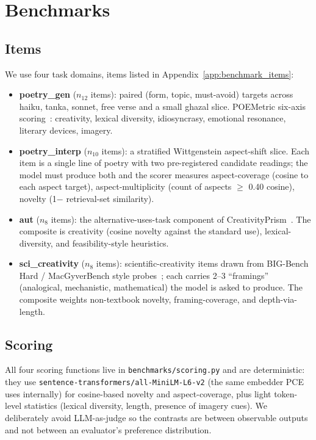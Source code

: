 \section{Benchmarks}\label{sec:benchmarks}

\subsection{Items}

We use four task domains, items listed in Appendix~\ref{app:benchmark_items}:

\begin{itemize}[leftmargin=1.4em]
\item \textbf{poetry\_gen} ($n_{\text{12}}$ items): paired (form, topic, must-avoid) targets across haiku, tanka, sonnet, free verse and a small ghazal slice. POEMetric six-axis scoring~\citep{Ye2025POEMetric}: creativity, lexical diversity, idiosyncrasy, emotional resonance, literary devices, imagery.
\item \textbf{poetry\_interp} ($n_{\text{10}}$ items): a stratified Wittgenstein aspect-shift slice. Each item is a single line of poetry with two pre-registered candidate readings; the model must produce both and the scorer measures aspect-coverage (cosine to each aspect target), aspect-multiplicity (count of aspects $\geq$ 0.40 cosine), novelty (1$-$ retrieval-set similarity).
\item \textbf{aut} ($n_{\text{8}}$ items): the alternative-uses-task component of CreativityPrism~\citep{CreativityPrism2025}. The composite is creativity (cosine novelty against the standard use), lexical-diversity, and feasibility-style heuristics.
\item \textbf{sci\_creativity} ($n_{\text{8}}$ items): scientific-creativity items drawn from BIG-Bench Hard / MacGyverBench style probes~\citep{suzgun2023bbh,Tian2024MacGyver}; each carries 2--3 ``framings'' (analogical, mechanistic, mathematical) the model is asked to produce. The composite weights non-textbook novelty, framing-coverage, and depth-via-length.
\end{itemize}

\subsection{Scoring}

All four scoring functions live in \texttt{benchmarks/scoring.py} and are deterministic: they use \texttt{sentence-transformers/all-MiniLM-L6-v2} (the same embedder PCE uses internally) for cosine-based novelty and aspect-coverage, plus light token-level statistics (lexical diversity, length, presence of imagery cues). We deliberately avoid LLM-as-judge so the contrasts are between observable outputs and not between an evaluator's preference distribution.

